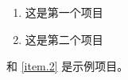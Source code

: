 \documentclass{ctexart}
\begin{document}
\begin{enumerate}
	\item \label{item.1} 这是第一个项目
	\item \label{item.2} 这是第二个项目
\end{enumerate}

 和 \cref{item.2} 是示例项目。
\end{document}
